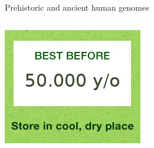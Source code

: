 \documentclass[10pt]{beamer}
\begin{document}
\begin{frame}{Prehistoric and ancient human genomes}
\begin{columns}
\begin{column}{0.25\textwidth}
\begin{center}
			\includegraphics[width=\textwidth]{./figures/bestbefore.jpg}
		\end{center}
	\end{column}
\end{columns}
\end{frame}
\end{document}
